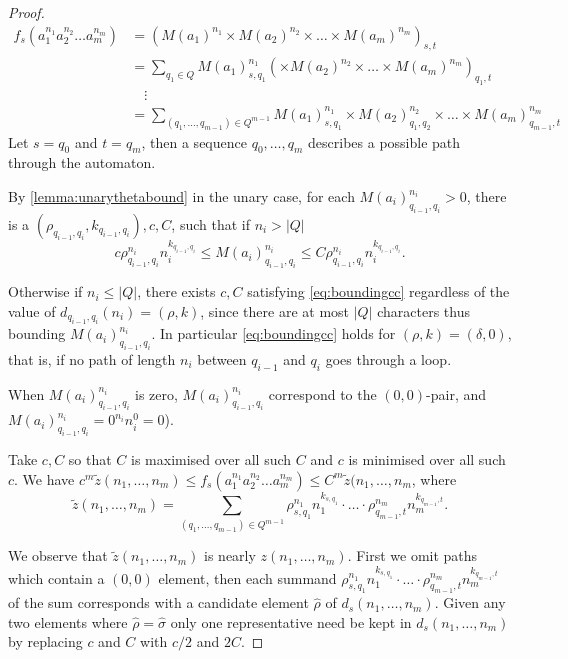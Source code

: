 \documentclass{lmcs}
\theoremstyle{plain}
\theoremstyle{definition}
\theoremstyle{remark}
\newcommand\dgf{d}
\renewcommand\nu{f}
\begin{document}
\begin{proof}

\begin{align*}
\nu_s(a_1^{n_1}a_2^{n_2}\dots a_m^{n_m}) &=  (M(a_1)^{n_1}\times M(a_2)^{n_2}\times \dots \times M(a_m)^{n_m})_{s,t}
\\ &= \sum_{q_1 \in Q} M(a_1)^{n_1}_{s,q_1}(\times M(a_2)^{n_2}\times \dots \times M(a_m)^{n_m})_{q_1,t}
\\ & \quad \vdots
\\ &= \sum_{(q_1,\dots,q_{m-1})\in Q^{m-1}} M(a_1)^{n_1}_{s,q_1}\times M(a_2)^{n_2}_{q_1,q_2}\times \dots \times M(a_m)^{n_m}_{q_{m-1},t}
\end{align*}
Let $s = q_0$ and $t = q_m$, then a sequence $q_0,\dots,q_m$ describes a possible path through the automaton.

By \cref{lemma:unarythetabound} in the unary case, for each $M(a_i)^{n_i}_{q_{i-1},q_i} >0$, there is a $(\rho_{q_{i-1},q_i},k_{q_{i-1},q_i}),c,C$, such that if $n_i > |Q|$ \begin{equation}\label{eq:boundingcc}c\rho_{q_{i-1},q_i}^{n_i}n_i^{k_{q_{i-1},q_i}} \le M(a_i)^{n_i}_{q_{i-1},q_i} \le C \rho_{q_{i-1},q_i}^{n_i}n_i^{k_{q_{i-1},q_i}}.\end{equation}

Otherwise if $n_i \le |Q|$, there exists $c,C$ satisfying \cref{eq:boundingcc} regardless of the value of $\dgf_{q_{i-1},q_i}(n_i) = (\rho,k)$, since there are at most $|Q|$ characters thus bounding $M(a_i)^{n_i}_{q_{i-1},q_i}$. In particular \cref{eq:boundingcc} holds for $(\rho,k) = (\delta,0)$, that is, if no path of length $n_i$ between $q_{i-1}$ and $q_i$ goes through a loop.

When $M(a_i)^{n_i}_{q_{i-1},q_i}$ is zero, $M(a_i)^{n_i}_{q_{i-1},q_i}$ correspond to the $(0,0)$-pair, and $M(a_i)^{n_i}_{q_{i-1},q_i} = 0^{n_i}n_i^{0} = 0$).

Take $c,C$ so that $C$ is maximised over all such $C$ and $c$ is minimised over all such $c$. We have  $
c^{m} \tilde{z}(n_1,\dots,n_m)  \le \nu_s(a_1^{n_1}a_2^{n_2}\dots a_m^{n_m}) \le  C^{m}\tilde{z}(n_1,\dots,n_m $, where
\[
\tilde{z}(n_1,\dots,n_m) = \sum_{(q_1,\dots,q_{m-1})\in Q^{m-1}} \rho_{s,q_1}^{n_1}n_1^{k_{s,q_1}}
\cdot \ldots \cdot \rho_{q_{m-1},t}^{n_m}n_m^{k_{q_{m-1},t}}.
\]

We observe that $\tilde{z}(n_1,\dots,n_m)$ is nearly $z(n_1,\dots,n_m)$.  First we omit paths which contain a $(0,0)$ element, then each summand $\rho_{s,q_1}^{n_1}n_1^{k_{s,q_1}}\cdot
\ldots \cdot \rho_{q_{m-1},t}^{n_m}n_m^{k_{q_{m-1},t}}$ of the sum corresponds with a candidate element $\hat{\rho}$ of $\dgf_s(n_1,\dots,n_m)$.
Given any two elements where $\hat{\rho}= \hat{\sigma}$ only one representative need be kept in $\dgf_s(n_1,\dots,n_m)$ by replacing $c$ and $C$ with $c/2$ and $2C$.


\end{proof}
\end{document}
